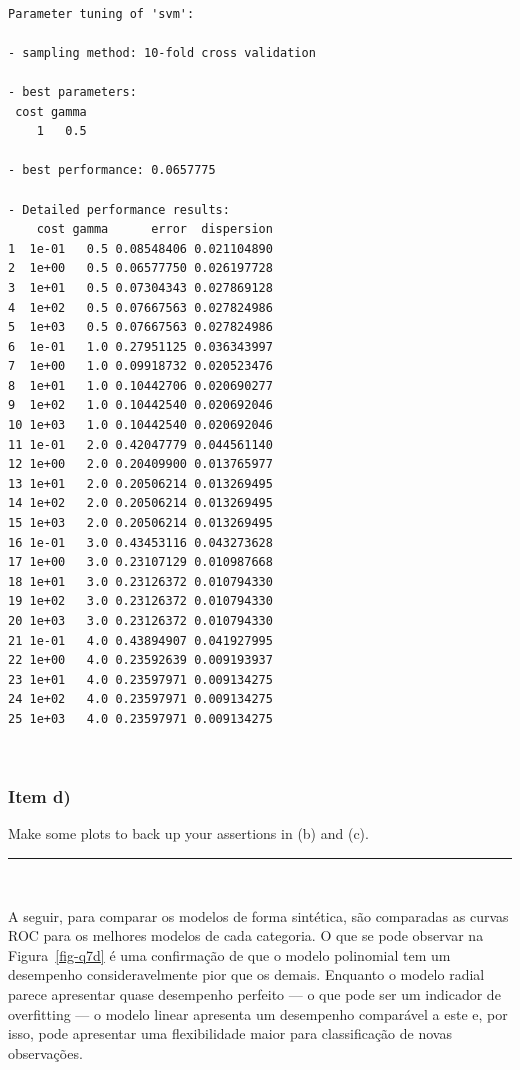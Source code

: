\documentclass[
  a4paperpaper,
]{article}
\begin{document}
\begin{verbatim}

Parameter tuning of 'svm':

- sampling method: 10-fold cross validation 

- best parameters:
 cost gamma
    1   0.5

- best performance: 0.0657775 

- Detailed performance results:
    cost gamma      error  dispersion
1  1e-01   0.5 0.08548406 0.021104890
2  1e+00   0.5 0.06577750 0.026197728
3  1e+01   0.5 0.07304343 0.027869128
4  1e+02   0.5 0.07667563 0.027824986
5  1e+03   0.5 0.07667563 0.027824986
6  1e-01   1.0 0.27951125 0.036343997
7  1e+00   1.0 0.09918732 0.020523476
8  1e+01   1.0 0.10442706 0.020690277
9  1e+02   1.0 0.10442540 0.020692046
10 1e+03   1.0 0.10442540 0.020692046
11 1e-01   2.0 0.42047779 0.044561140
12 1e+00   2.0 0.20409900 0.013765977
13 1e+01   2.0 0.20506214 0.013269495
14 1e+02   2.0 0.20506214 0.013269495
15 1e+03   2.0 0.20506214 0.013269495
16 1e-01   3.0 0.43453116 0.043273628
17 1e+00   3.0 0.23107129 0.010987668
18 1e+01   3.0 0.23126372 0.010794330
19 1e+02   3.0 0.23126372 0.010794330
20 1e+03   3.0 0.23126372 0.010794330
21 1e-01   4.0 0.43894907 0.041927995
22 1e+00   4.0 0.23592639 0.009193937
23 1e+01   4.0 0.23597971 0.009134275
24 1e+02   4.0 0.23597971 0.009134275
25 1e+03   4.0 0.23597971 0.009134275
\end{verbatim}

~

\subsubsection{Item d)}\label{item-d}

Make some plots to back up your assertions in (b) and (c).

\begin{center}\rule{0.5\linewidth}{0.5pt}\end{center}

~

A seguir, para comparar os modelos de forma sintética, são comparadas as
curvas ROC para os melhores modelos de cada categoria. O que se pode
observar na Figura~\ref{fig-q7d} é uma confirmação de que o modelo
polinomial tem um desempenho consideravelmente pior que os demais.
Enquanto o modelo radial parece apresentar quase desempenho perfeito ---
o que pode ser um indicador de overfitting --- o modelo linear apresenta
um desempenho comparável a este e, por isso, pode apresentar uma
flexibilidade maior para classificação de novas observações.
\end{document}
